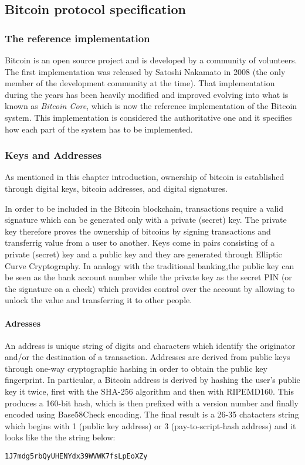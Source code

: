 \subsection{Bitcoin protocol specification}
\subsubsection{The reference implementation}
Bitcoin is an open source project and is developed by a community of volunteers.
The first implementation was released by Satoshi Nakamato in 2008 (the only member
of the development community at the time). That implementation during the years
has been heavily modified and improved evolving into what is known as \emph{Bitcoin
Core}, which is now the reference implementation of the Bitcoin system. This
implementation is considered the authoritative one and it specifies how each
part of the system has to be implemented.


\subsubsection{Keys and Addresses}
As mentioned in this chapter introduction, ownership of bitcoin is established
through digital keys, bitcoin addresses, and digital signatures.

In order to be included in the Bitcoin blockchain, transactions require a valid
signature which can be generated only with a private (secret) key. The private
key therefore proves the ownership of bitcoins by signing transactions and
transferrig value from a user to another. Keys come in pairs consisting of a
private (secret) key and a public key and they are generated through Elliptic
Curve Cryptography. In analogy with the traditional banking,the public key can be
seen as the bank account number while the private key as the secret PIN (or the
signature on a check) which provides control over the account by allowing to unlock
the value and transferring it to other people.

\paragraph{Adresses}
An address is unique string of digits and characters which identify the originator
and/or the destination of a transaction. Addresses are derived from public keys
through one-way cryptographic hashing in order to obtain the public key fingerprint.
In particular, a Bitcoin address is derived by hashing the user's public key it twice,
first with the SHA-256 algorithm and then with RIPEMD160. This produces a 160-bit
hash, which is then prefixed with a version number and finally encoded using
Base58Check encoding. The final result is a 26-35 chatacters string which begins
with 1 (public key address) or 3 (pay-to-script-hash address) and it looks like the
the string below:
\begin{center}
  \texttt{1J7mdg5rbQyUHENYdx39WVWK7fsLpEoXZy}
\end{center}

